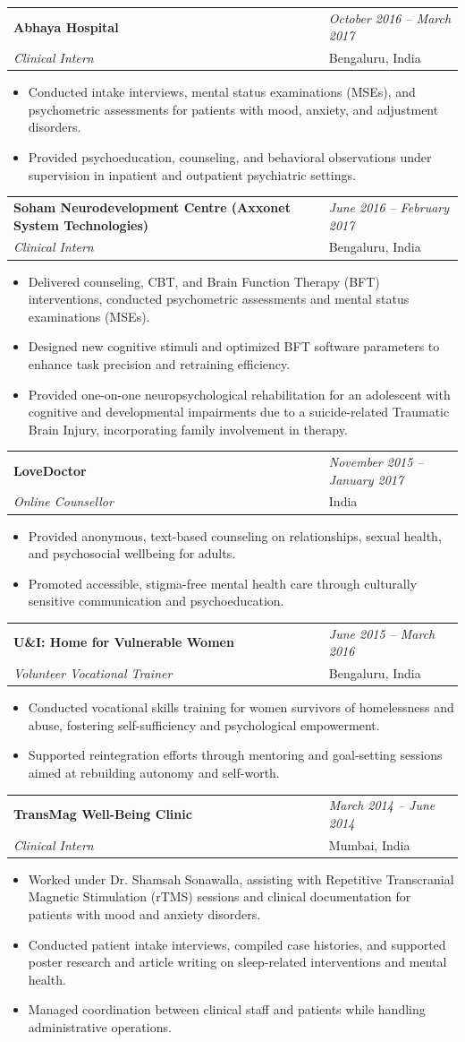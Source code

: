\documentclass[a4paper,11pt]{article}
\newcommand{\resumeSubheading}[4]{
\vspace{0.5mm}\item
    \begin{tabularx}{0.98\textwidth}[t]{p{0.7\linewidth} >{\raggedleft\arraybackslash}p{0.3\linewidth}}
        \textbf{#1} & \textit{\footnotesize{#4}} \\
        \textit{{#3}} &  \footnotesize{#2}\\
    \end{tabularx}
    \vspace{-2.4mm}
}
\newcommand{\resumeItemListStart}{\begin{itemize}[leftmargin=*,labelsep=1mm,itemsep=0.5mm]}
\newcommand{\resumeItemListEnd}{\end{itemize}\vspace{-2mm}}
\begin{document}
\resumeSubheading
{Abhaya Hospital}{Bengaluru, India}
{Clinical Intern}
{October 2016 – March 2017}
\resumeItemListStart
\item Conducted intake interviews, mental status examinations (MSEs), and psychometric assessments for patients with mood, anxiety, and adjustment disorders.
\item Provided psychoeducation, counseling, and behavioral observations under supervision in inpatient and outpatient psychiatric settings.
\resumeItemListEnd

\resumeSubheading
{Soham Neurodevelopment Centre (Axxonet System Technologies)}{Bengaluru, India}
{Clinical Intern}
{June 2016 – February 2017}
\resumeItemListStart
\item Delivered counseling, CBT, and Brain Function Therapy (BFT) interventions, conducted psychometric assessments and mental status examinations (MSEs).
\item Designed new cognitive stimuli and optimized BFT software parameters to enhance task precision and retraining efficiency.
\item Provided one-on-one neuropsychological rehabilitation for an adolescent with cognitive and developmental impairments due to a suicide-related Traumatic Brain Injury,
incorporating family involvement in therapy.
\resumeItemListEnd

\resumeSubheading
{LoveDoctor}{India}
{Online Counsellor}
{November 2015 – January 2017}
\resumeItemListStart
\item Provided anonymous, text-based counseling on relationships, sexual health, and psychosocial wellbeing for adults.
\item Promoted accessible, stigma-free mental health care through culturally sensitive communication and psychoeducation.
\resumeItemListEnd

\resumeSubheading
{U\&I: Home for Vulnerable Women}{Bengaluru, India}
{Volunteer Vocational Trainer}
{June 2015 – March 2016}
\resumeItemListStart
\item Conducted vocational skills training for women survivors of homelessness and abuse, fostering self-sufficiency and psychological empowerment.
\item Supported reintegration efforts through mentoring and goal-setting sessions aimed at rebuilding autonomy and self-worth.
\resumeItemListEnd

\resumeSubheading
{TransMag Well-Being Clinic}{Mumbai, India}
{Clinical Intern}
{March 2014 – June 2014}
\resumeItemListStart
\item Worked under Dr. Shamsah Sonawalla, assisting with Repetitive Transcranial Magnetic Stimulation (rTMS) sessions and clinical documentation for patients with mood and anxiety disorders.
\item Conducted patient intake interviews, compiled case histories, and supported poster research and article writing on sleep-related interventions and mental health.
\item Managed coordination between clinical staff and patients while handling administrative operations.
\resumeItemListEnd
\end{document}
